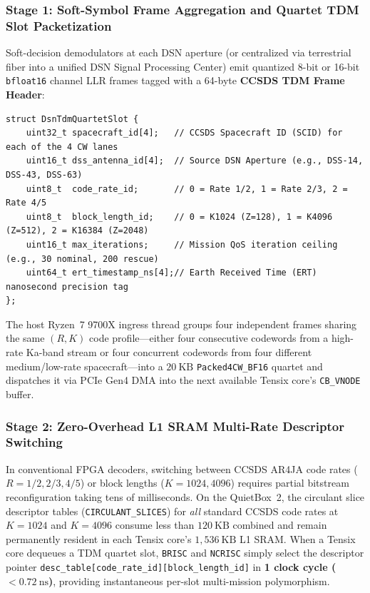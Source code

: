 \documentclass[10pt]{article}
\begin{document}
\subsubsection{Stage 1: Soft-Symbol Frame Aggregation and Quartet TDM Slot Packetization}
Soft-decision demodulators at each DSN aperture (or centralized via terrestrial fiber into a unified DSN Signal Processing Center) emit quantized 8-bit or 16-bit \texttt{bfloat16} channel LLR frames tagged with a 64-byte \textbf{CCSDS TDM Frame Header}:
\begin{lstlisting}[caption={Multi-Mission DSN Time-Division Multiplexed (TDM) Quartet Slot Descriptor.}]
struct DsnTdmQuartetSlot {
    uint32_t spacecraft_id[4];   // CCSDS Spacecraft ID (SCID) for each of the 4 CW lanes
    uint16_t dss_antenna_id[4];  // Source DSN Aperture (e.g., DSS-14, DSS-43, DSS-63)
    uint8_t  code_rate_id;       // 0 = Rate 1/2, 1 = Rate 2/3, 2 = Rate 4/5
    uint8_t  block_length_id;    // 0 = K1024 (Z=128), 1 = K4096 (Z=512), 2 = K16384 (Z=2048)
    uint16_t max_iterations;     // Mission QoS iteration ceiling (e.g., 30 nominal, 200 rescue)
    uint64_t ert_timestamp_ns[4];// Earth Received Time (ERT) nanosecond precision tag
};
\end{lstlisting}
The host Ryzen~7 9700X ingress thread groups four independent frames sharing the same $(R, K)$ code profile---either four consecutive codewords from a high-rate Ka-band stream or four concurrent codewords from four different medium/low-rate spacecraft---into a $20\ \mathrm{KB}$ \texttt{Packed4CW\_BF16} quartet and dispatches it via PCIe Gen4 DMA into the next available Tensix core's \texttt{CB\_VNODE} buffer.

\subsubsection{Stage 2: Zero-Overhead L1 SRAM Multi-Rate Descriptor Switching}
In conventional FPGA decoders, switching between CCSDS AR4JA code rates ($R = 1/2, 2/3, 4/5$) or block lengths ($K = 1024, 4096$) requires partial bitstream reconfiguration taking tens of milliseconds. On the QuietBox~2, the circulant slice descriptor tables (\texttt{CIRCULANT\_SLICES}) for \emph{all} standard CCSDS code rates at $K=1024$ and $K=4096$ consume less than $120\ \mathrm{KB}$ combined and remain permanently resident in each Tensix core's $1,536\ \mathrm{KB}$ L1 SRAM. When a Tensix core dequeues a TDM quartet slot, \texttt{BRISC} and \texttt{NCRISC} simply select the descriptor pointer \texttt{desc\_table[code\_rate\_id][block\_length\_id]} in \textbf{1 clock cycle ($<0.72\ \mathrm{ns}$)}, providing instantaneous per-slot multi-mission polymorphism.
\end{document}
